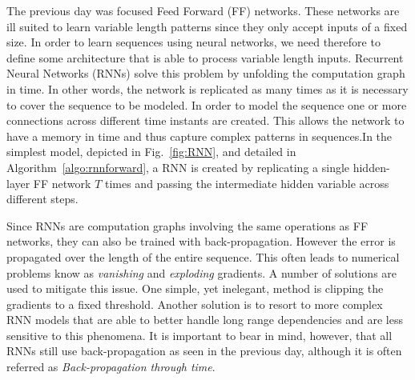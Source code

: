 The previous day was focused Feed Forward (FF) networks. These networks are ill
suited to learn variable length patterns since they only accept inputs of a
fixed size. In order to learn sequences using neural networks, we need therefore
to define some architecture that is able to process variable length inputs.
Recurrent Neural Networks (RNNs) solve this problem by unfolding the
computation graph in time. In other words, the network is replicated as many
times as it is necessary to cover the sequence to be modeled. In order
to model the sequence one or more connections across different time instants are
created. This allows the network to have a memory in time and thus capture
complex patterns in sequences.In the simplest model, depicted in
Fig.~\ref{fig:RNN}, and detailed in Algorithm~\ref{algo:rnnforward}, a RNN is
created by replicating a single hidden-layer FF network $T$ times and passing
the intermediate hidden variable across different steps. 

Since RNNs are computation graphs involving the same operations as FF networks,
they can also be trained with back-propagation. However the error is
 propagated over the length of the entire sequence. This often leads to 
numerical problems know as \textit{vanishing} and \textit{exploding} gradients.
A number of solutions are used to mitigate this issue. One simple, yet inelegant,
method is clipping the gradients to a fixed threshold. Another solution is to resort to more complex 
RNN models that are able to better handle long range dependencies and are less
sensitive to this phenomena. It is important to bear in mind, however, that
all RNNs still use back-propagation as seen in the previous day, although it is
often referred as \textit{Back-propagation through time}. 


